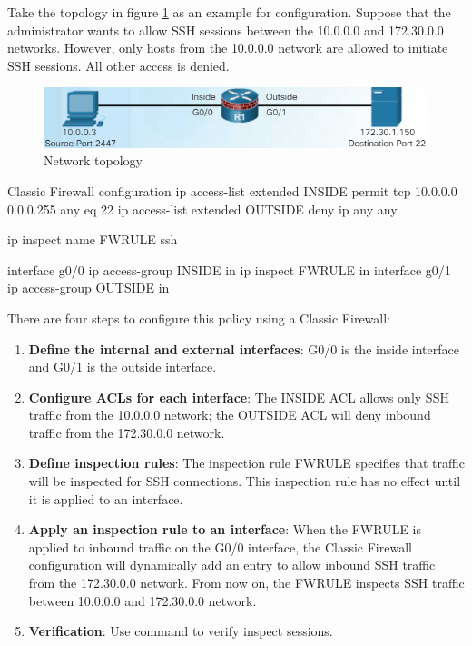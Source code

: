 Take the topology in figure \ref{ClassicConfig} as an example for configuration. Suppose that the administrator wants to allow SSH sessions between the 10.0.0.0 and 172.30.0.0 networks. However, only hosts from the 10.0.0.0 network are allowed to initiate SSH sessions. All other access is denied. 

\begin{figure}[hbtp]
\caption{Network topology}\label{ClassicConfig}
\centering
\includegraphics[width=10\xm]{pictures/ClassicConfig.PNG}
\end{figure}


\begin{sexylisting}{Classic Firewall configuration}
ip access-list extended INSIDE
  permit tcp 10.0.0.0 0.0.0.255 any eq 22
ip access-list extended OUTSIDE
  deny ip any any

ip inspect name FWRULE ssh

interface g0/0
  ip access-group INSIDE in
  ip inspect FWRULE in
interface g0/1
  ip access-group OUTSIDE in
\end{sexylisting}

There are four steps to configure this policy using a Classic Firewall:

\begin{enumerate}
\item \textbf{Define the internal and external interfaces}: G0/0 is the inside interface and G0/1 is the outside interface.
\item \textbf{Configure ACLs for each interface}: The INSIDE ACL allows only SSH traffic from the 10.0.0.0 network; the OUTSIDE ACL will deny inbound traffic from the 172.30.0.0 network.
\item \textbf{Define inspection rules}: The inspection rule FWRULE specifies that traffic will be inspected for SSH connections. This inspection rule has no effect until it is applied to an interface.
\item \textbf{Apply an inspection rule to an interface}: When the FWRULE is applied to inbound traffic on the G0/0 interface, the Classic Firewall configuration will dynamically add an entry to allow inbound SSH traffic from the 172.30.0.0 network. From now on, the FWRULE inspects SSH traffic between 10.0.0.0 and 172.30.0.0 network.
\item \textbf{Verification}: Use  command to verify inspect sessions.
\end{enumerate}

